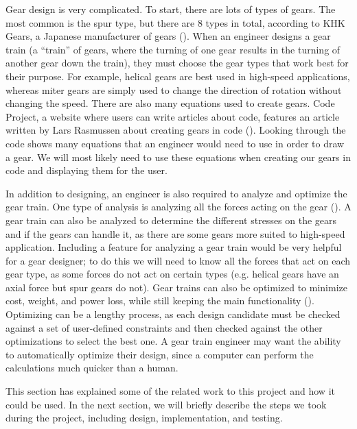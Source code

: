\begin{doublespace}
Gear design is very complicated. To start, there are lots of types of gears. The most common is the spur type, but there are 8 types in total, according to KHK Gears, a Japanese manufacturer of gears (\cite{kohara_gear_industry_introduction_2015}). When an engineer designs a gear train (a ``train'' of gears, where the turning of one gear results in the turning of another gear down the train), they must choose the gear types that work best for their purpose. For example, helical gears are best used in high-speed applications, whereas miter gears are simply used to change the direction of rotation without changing the speed. There are also many equations used to create gears. Code Project, a website where users can write articles about code, features an article written by Lars Rasmussen about creating gears in code (\cite{rasmussen_drawing_2015}). Looking through the code shows many equations that an engineer would need to use in order to draw a gear. We will most likely need to use these equations when creating our gears in code and displaying them for the user.

In addition to designing, an engineer is also required to analyze and optimize the gear train. One type of analysis is analyzing all the forces acting on the gear (\cite{radhakrishnan_introduction_2020}). A gear train can also be analyzed to determine the different stresses on the gears and if the gears can handle it, as there are some gears more suited to high-speed application. Including a feature for analyzing a gear train would be very helpful for a gear designer; to do this we will need to know all the forces that act on each gear type, as some forces do not act on certain types (e.g. helical gears have an axial force but spur gears do not). Gear trains can also be optimized to minimize cost, weight, and power loss, while still keeping the main functionality (\cite{swantner_topological_2011}). Optimizing can be a lengthy process, as each design candidate must be checked against a set of user-defined constraints and then checked against the other optimizations to select the best one. A gear train engineer may want the ability to automatically optimize their design, since a computer can perform the calculations much quicker than a human.

This section has explained some of the related work to this project and how it could be used. In the next section, we will briefly describe the steps we took during the project, including design, implementation, and testing.

\end{doublespace}